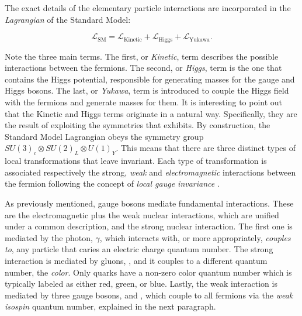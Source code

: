 
The exact details of the elementary particle interactions are incorporated in the
{\it Lagrangian} of the Standard Model:

\begin{equation}
\mathscr{L}_{\text{SM}} =
\mathscr{L}_{\text{Kinetic}} + \mathscr{L}_{\text{Higgs}} + \mathscr{L}_{\text{Yukawa}}.
\label{lagrangian}
\end{equation}

\noindent Note the three main terms. The first, or {\it Kinetic}, term describes the possible interactions between the fermions.
The second, or {\it Higgs}, term is the one that contains the Higgs potential, responsible for generating
masses for the gauge and Higgs bosons. The last, or {\it Yukawa}, term is introduced to
couple the Higgs field with the fermions and generate masses for them.
It is interesting to point out that the Kinetic and Higgs terms originate in a natural way.
Specifically, they are the result of exploiting the symmetries that  exhibits.
By construction, the Standard Model Lagrangian obeys the symmetry group $SU(3)_c\otimes SU(2)_L\otimes U(1)_Y$.
This means that there are three distinct types of local transformations that leave  invariant.
Each type of transformation is associated respectively the strong, {\it weak} and {\it electromagnetic} interactions
between the fermion following the concept of {\it local gauge invariance} \cite{aitchison,halzen1984quarks}.

As previously mentioned, gauge bosons mediate fundamental interactions. These are the electromagnetic
plus the weak nuclear interactions, which are unified under a common description, and the strong nuclear interaction.
The first one is mediated by the photon, $\gamma$, which interacts with, or more appropriately, {\it couples to}, any particle that
caries an electric charge quantum number. The strong interaction is mediated by gluons, \gluon,
and it couples to a different quantum number, the  {\it color}.
Only quarks have a non-zero color quantum number which is typically labeled as either red, green, or blue.
Lastly, the weak interaction is mediated by three gauge bosons, \Wpm and \Z, which couple to all fermions via
the {\it weak isospin} quantum number, explained in the next paragraph.

